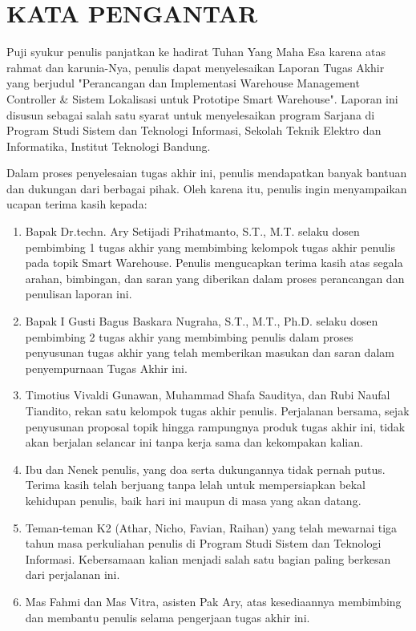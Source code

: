 \chapter*{KATA PENGANTAR}

Puji syukur penulis panjatkan ke hadirat Tuhan Yang Maha Esa karena atas rahmat dan karunia-Nya, penulis dapat menyelesaikan Laporan Tugas Akhir yang berjudul "Perancangan dan Implementasi Warehouse Management Controller \& Sistem Lokalisasi untuk Prototipe Smart Warehouse". Laporan ini disusun sebagai salah satu syarat untuk menyelesaikan program Sarjana di Program Studi Sistem dan Teknologi Informasi, Sekolah Teknik Elektro dan Informatika, Institut Teknologi Bandung.

Dalam proses penyelesaian tugas akhir ini, penulis mendapatkan banyak bantuan dan dukungan dari berbagai pihak. Oleh karena itu, penulis ingin menyampaikan ucapan terima kasih kepada:

\begin{enumerate}
    \item Bapak Dr.techn. Ary Setijadi Prihatmanto, S.T., M.T. selaku dosen pembimbing 1 tugas akhir yang membimbing kelompok tugas akhir penulis pada topik Smart Warehouse. Penulis mengucapkan terima kasih atas segala arahan, bimbingan, dan saran yang diberikan dalam proses perancangan dan penulisan laporan ini.

    \item Bapak I Gusti Bagus Baskara Nugraha, S.T., M.T., Ph.D. selaku dosen pembimbing 2 tugas akhir yang membimbing penulis dalam proses penyusunan tugas akhir yang telah memberikan masukan dan saran dalam penyempurnaan Tugas Akhir ini.

    \item Timotius Vivaldi Gunawan, Muhammad Shafa Sauditya, dan Rubi Naufal Tiandito, rekan satu kelompok tugas akhir penulis. Perjalanan bersama, sejak penyusunan proposal topik hingga rampungnya produk tugas akhir ini, tidak akan berjalan selancar ini tanpa kerja sama dan kekompakan kalian.

    \item Ibu dan Nenek penulis, yang doa serta dukungannya tidak pernah putus. Terima kasih telah berjuang tanpa lelah untuk mempersiapkan bekal kehidupan penulis, baik hari ini maupun di masa yang akan datang.

    \item Teman-teman K2 (Athar, Nicho, Favian, Raihan) yang telah mewarnai tiga tahun masa perkuliahan penulis di Program Studi Sistem dan Teknologi Informasi. Kebersamaan kalian menjadi salah satu bagian paling berkesan dari perjalanan ini.

    \item Mas Fahmi dan Mas Vitra, asisten Pak Ary, atas kesediaannya membimbing dan membantu penulis selama pengerjaan tugas akhir ini.
\end{enumerate}

